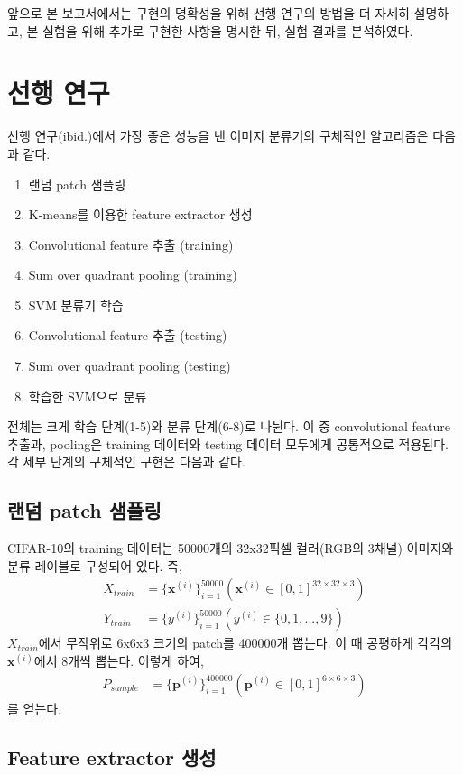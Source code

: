 \documentclass[a4paper,9pt]{article}
\begin{document}
\begin{multicols}{2}
앞으로 본 보고서에서는 구현의 명확성을 위해 선행 연구의 방법을 더 자세히 설명하고, 본 실험을 위해 추가로 구현한 사항을 명시한 뒤, 실험 결과를 분석하였다.

\section{선행 연구}

선행 연구(ibid.)에서 가장 좋은 성능을 낸 이미지 분류기의 구체적인 알고리즘은 다음과 같다.
\begin{enumerate}
\item 랜덤 patch 샘플링
\item K-means를 이용한 feature extractor 생성
\item Convolutional feature 추출 (training)
\item Sum over quadrant pooling (training)
\item SVM 분류기 학습
\item Convolutional feature 추출 (testing)
\item Sum over quadrant pooling (testing)
\item 학습한 SVM으로 분류
\end{enumerate}
전체는 크게 학습 단계(1-5)와 분류 단계(6-8)로 나뉜다.
이 중 convolutional feature 추출과, pooling은 training 데이터와 testing 데이터 모두에게 공통적으로 적용된다.
각 세부 단계의 구체적인 구현은 다음과 같다.

\subsection{랜덤 patch 샘플링}

CIFAR-10의 training 데이터는 50000개의 32x32픽셀 컬러(RGB의 3채널) 이미지와 분류 레이블로 구성되어 있다.
즉,
\begin{align*}
    X_{train} &= \{ \mathbf{x}^{(i)} \}_{i=1}^{50000} ( \mathbf{x}^{(i)} \in [0, 1]^{32 \times 32 \times 3} ) \\
    Y_{train} &= \{ y^{(i)} \}_{i=1}^{50000} ( y^{(i)} \in \{0, 1, ..., 9\} )
\end{align*}
$X_{train}$에서 무작위로 6x6x3 크기의 patch를 400000개 뽑는다.
이 때 공평하게 각각의 $\mathbf{x}^{(i)}$에서 8개씩 뽑는다.
이렇게 하여,
\begin{align*}
    P_{sample} &= \{ \mathbf{p}^{(i)} \}_{i=1}^{400000} ( \mathbf{p}^{(i)} \in [0, 1]^{6 \times 6 \times 3} )
\end{align*}
를 얻는다.

\subsection{Feature extractor 생성}
\label{sec:feature_extractor}


\end{multicols}
\end{document}
